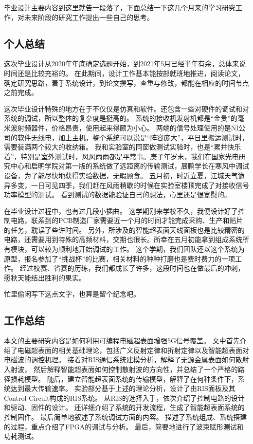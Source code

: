 \documentclass[supercite]{HustGraduPaper}
\begin{document}
毕业设计主要内容到这里就告一段落了，下面总结一下这几个月来的学习研究工作，对未来阶段的研究工作提出一些自己的思考。

\subsection{个人总结}

这次毕业设计从2020年年底确定选题开始，到2021年5月已经半年有余，总体来说时间还是比较充裕的。
在此期间，设计工作基本能按部就班地推进，阅读论文，确定研究思路，着手系统设计，到论文撰写，查重与修改，都能在相应的时间节点之前完成。

这次毕业设计特殊的地方在于不仅仅是仿真和软件。还包含一些对硬件的调试和对系统的调试，所以整体的复杂度是挺高的。
系统的接收机发射机都是“金贵”的毫米波射频器件，价格昂贵，使用起来得颇为小心。
两端的信号处理使用的是NI公司的软件无线电，加上主机，整个系统可以说是“阵容庞大”，平日里搬运测试时，需要装满两个较大的收纳箱。
我和实验室的同窗做测试实验时，也是“累并快乐着”，特别是室外测试时，风风雨雨都是平常事。庚子年岁末，我们在国家光电研究中心和启明学院对第一版的系统做了远距离的传输测试，展鹏学长在寒风中调试设备，为了能尽快地获得实验数据，无暇顾食。
五月初，时近立夏，江城天气诡异多变，一日可见四季，我们赶在风雨稍歇的时候在实验室楼顶完成了对接收信号功率模型的测试。
看到测试的数据能验证自己的想法，心里还是很宽慰的。

在毕业设计过程中，也有过几段小插曲。
这学期刚来学校不久，我便设计好了控制电路，联系到的PCB制造厂家需要近一个月的时间才能完成采购、生产和贴片的任务，耽误了些许时间。
另外，所涉及的智能超表面天线面板也是比较精密的电路，还需要用到特殊的高频材料，交期也很长。所幸在五月初能拿到组成系统所有模块，可以较为顺利地开始调试的工作。
这个学期，我们团队还以这个系统为原型，报名参加了“挑战杯”的比赛，相关材料的种种打磨也是费时费力的一项工作。
经过校赛、省赛的历练，我们都成长了许多，这段时间也在做最后的冲刺，愿秋天能结出胜利的果实。

忙里偷闲写下这点文字，也算是留个纪念吧。

\subsection{工作总结}

本文的主要研究内容是如何利用可编程电磁超表面增强5G信号覆盖。
文中首先介绍了电磁超表面的相关基础理论，包括广义反射定律和折射定律以及智能超表面对电磁波的调控机理。
接着对RIS通信系统建模分析，解释了无源金属表面如何散射入射波，
然后解释智能超表面如何控制散射波的方向性，并总结了一个严格的路径损耗模型。
随后，建立智能超表面系统的传输模型，解释了在何种条件下，系统达到最大传输速率。
实验部分基于上述的理论分析，设计了由RIS面板及其Control Circuit构成的RIS系统。
从RIS的选择入手，依次介绍了控制电路的设计和驱动、固件的设计。
还详细介绍了系统的开发流程，生成了智能超表面系统的控制固件。
最后简单地叙述了系统调试方面的内容。
描述了系统组成、系统搭建的过程，重点介绍了FPGA的调试与分析。
最后，简要地进行了波束赋形测试和功耗测试。
\end{document}
